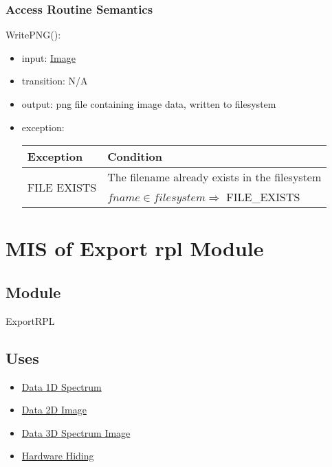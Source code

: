 \documentclass[12pt, titlepage]{article}
\begin{document}
\subsubsection{Access Routine Semantics}

\noindent WritePNG():
\begin{itemize}
    \item input: \hyperref[Mod:Image]{Image}
    \item transition: N/A
    \item output: png file containing image data, written to filesystem
    \item exception:
    \begin{center}
        \begin{tabular}{p{3cm} p{12cm}}
            \toprule[0.15em]
            \textbf{Exception} & \textbf{Condition}\\
            \midrule[0.1em]
            \multirow{2}{0.25\textwidth}{FILE EXISTS} & The filename already
            exists in the filesystem\\ 
            & $fname \in filesystem \Rightarrow$ FILE\_EXISTS\\ 
            \bottomrule[0.15em]
        \end{tabular}
    \end{center}
\end{itemize}

\section{MIS of Export rpl Module} \label{Mod:ExportRPL}

\subsection{Module}

ExportRPL

\subsection{Uses}
\begin{itemize}
    \item \hyperref[Mod:Spectrum]{Data 1D Spectrum}
    \item \hyperref[Mod:Image]{Data 2D Image}
    \item \hyperref[Mod:SI]{Data 3D Spectrum Image}
    \item \hyperref[Mod:HH]{Hardware Hiding}
\end{itemize}
\end{document}
